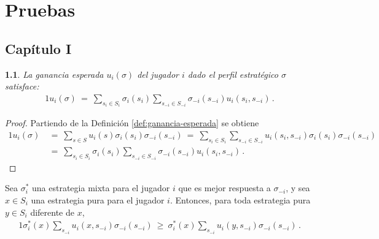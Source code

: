 \chapter{Pruebas}
\label{apex:chapter:pruebas}

\makeatletter
\newtheorem*{rep@theorem}{\rep@title}
\newcommand{\newreptheorem}[2]{
    \newenvironment{rep#1}[1]
    {
        \def\rep@title{#2 \ref{##1}}
        \begin{rep@theorem}
    }
     {
        \end{rep@theorem}
     }
}
\makeatother

\newreptheorem{theorem}{Teorema}


\section*{Capítulo I}

\begin{reptheorem}{theo:ganancia-esperada}
La ganancia esperada $u_i(\sigma)$ del jugador $i$ dado el perfil estratégico $\sigma$ satisface:
\begin{alignat}{1}
u_i(\sigma)\ =\ \sum_{s_i\in S_i} \sigma_i(s_i) \sum_{s_{-i}\in S_{-i}} \sigma_{-i}(s_{-i}) u_i(s_i,s_{-i}) \,.
\end{alignat}
\end{reptheorem}

\begin{proof}
Partiendo de la Definición \ref{def:ganancia-esperada} se obtiene
\begin{alignat}{1}
	u_i(\sigma)\  &=\ \sum_{s \in S} u_i(s) \sigma_i(s_i) \sigma_{-i}(s_{-i})\ =\ \sum_{s_i \in S_i} \sum_{s_{-i} \in S_{-i}} u_i(s_i, s_{-i}) \sigma_i(s_i) \sigma_{-i}(s_{-i}) \\
	&=\ \sum_{s_i\in S_i} \sigma_i(s_i) \sum_{s_{-i}\in S_{-i}} \sigma_{-i}(s_{-i}) u_i(s_i,s_{-i})\,.
\end{alignat}
\end{proof}

\begin{lemma}
\label{lemma:2}
Sea $\sigma^*_i$ una estrategia mixta para el jugador $i$ que es mejor respuesta a $\sigma_{-i}$, y sea $x\in S_i$ una estrategia pura para el jugador $i$. Entonces, para toda estrategia pura $y\in S_i$ diferente de $x$,
\begin{alignat}{1}
  \sigma^*_i(x) \sum_{s_{-i}} u_i(x,s_{-i}) \sigma_{-i}(s_{-i})\ \geq\ \sigma^*_i(x) \sum_{s_{-i}} u_i(y,s_{-i}) \sigma_{-i}(s_{-i}) \,.
\end{alignat}
\end{lemma}

